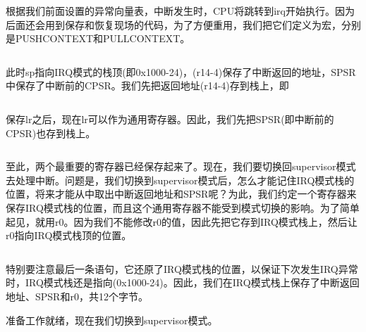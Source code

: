 \documentclass[main.tex]{subfiles}
\begin{document}
\begin{CJK*}{UTF8}{song}
\begin{code}
\label{code:3-5}
\inputminted[firstline=25,lastline=45,linenos,numbersep=5pt,frame=lines,framesep=2mm]{c}{src/chapter03/kernel/machdep.h}
\end{code}

根据我们前面设置的异常向量表，中断发生时，CPU将跳转到irq开始执行。因为后面还会用到保存和恢复现场的代码，为了方便重用，我们把它们定义为宏，分别是PUSHCONTEXT和PULLCONTEXT。

\begin{code}
\label{code:3-6}
\inputminted[firstline=143,lastline=151,linenos,numbersep=5pt,frame=lines,framesep=2mm]{gas}{src/chapter03/kernel/entry.S}
\end{code}

此时sp指向IRQ模式的栈顶(即0x1000-24)，(r14-4)保存了中断返回的地址，SPSR中保存了中断前的CPSR。我们先把返回地址(r14-4)存到栈上，即

\begin{code}
\label{code:3-7}
\inputminted[firstline=38,lastline=41,linenos,numbersep=5pt,frame=lines,framesep=2mm]{gas}{src/chapter03/kernel/entry.S}
\end{code}

保存lr之后，现在lr可以作为通用寄存器。因此，我们先把SPSR(即中断前的CPSR)也存到栈上。
\begin{code}
\label{code:3-8}
\inputminted[firstline=42,lastline=43,linenos,numbersep=5pt,frame=lines,framesep=2mm]{gas}{src/chapter03/kernel/entry.S}
\end{code}

至此，两个最重要的寄存器已经保存起来了。现在，我们要切换回supervisor模式去处理中断。问题是，我们切换到supervisor模式后，怎么才能记住IRQ模式栈的位置，将来才能从中取出中断返回地址和SPSR呢？为此，我们约定一个寄存器来保存IRQ模式栈的位置，而且这个通用寄存器不能受到模式切换的影响。为了简单起见，就用r0。因为我们不能修改r0的值，因此先把它存到IRQ模式栈上，然后让r0指向IRQ模式栈顶的位置。

\begin{code}
\label{code:3-9}
\inputminted[firstline=44,lastline=46,linenos,numbersep=5pt,frame=lines,framesep=2mm]{gas}{src/chapter03/kernel/entry.S}
\end{code}

特别要注意最后一条语句，它还原了IRQ模式栈的位置，以保证下次发生IRQ异常时，IRQ模式栈还是指向(0x1000-24)。因此，我们在IRQ模式栈上保存了中断返回地址、SPSR和r0，共12个字节。
\par
准备工作就绪，现在我们切换到supervisor模式。


\end{CJK*}
\end{document}
